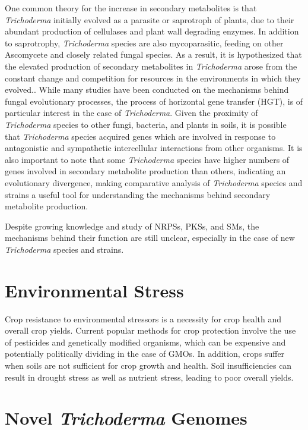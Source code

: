 One common theory for the increase in secondary metabolites is that \textit{Trichoderma} initially evolved as a parasite or saprotroph of plants, due to their abundant production of cellulases and plant wall degrading enzymes\cite{Kubicek2019}. In addition to saprotrophy, \textit{Trichoderma} species are also mycoparasitic, feeding on other Ascomycete and closely related fungal species\cite{Druzhinina2018}. As a result, it is hypothesized that the elevated production of secondary metabolites in \textit{Trichoderma} arose from the constant change and competition for resources in the environments in which they evolved.\cite{Mukherjee2012}. While many studies have been conducted on the mechanisms behind fungal evolutionary processes, the process of horizontal gene transfer (HGT), is of particular interest in the case of \textit{Trichoderma}\cite{Goncalves2024}.
Given the proximity of \textit{Trichoderma} species to other fungi, bacteria, and plants in soils, it is possible that \textit{Trichoderma} species acquired genes which are involved in response to antagonistic and sympathetic intercellular interactions from other organisms. It is also important to note that some \textit{Trichoderma} species have higher numbers of genes involved in secondary metabolite production than others, indicating an evolutionary divergence, making comparative analysis of \textit{Trichoderma} species and strains a useful tool for understanding the mechanisms behind secondary metabolite production\cite{Mukherjee2012}.

Despite growing knowledge and study of NRPSs, PKSs, and SMs, the mechanisms behind their function are still unclear\cite{Baker2012}, especially in the case of new \textit{Trichoderma} species and strains.


\section{Environmental Stress}

Crop resistance to environmental stressors is a necessity for crop
health and overall crop yields. Current popular methods for crop
protection involve the use of pesticides and genetically modified
organisms, which can be expensive and potentially politically dividing
in the case of GMOs\cite{doi:10.1080/10408390600762696}. In addition,
crops suffer when soils are not sufficient for crop growth and
health. Soil insufficiencies can result in drought stress as well as
nutrient stress, leading to poor overall yields.

\section{Novel \textit{Trichoderma} Genomes}

